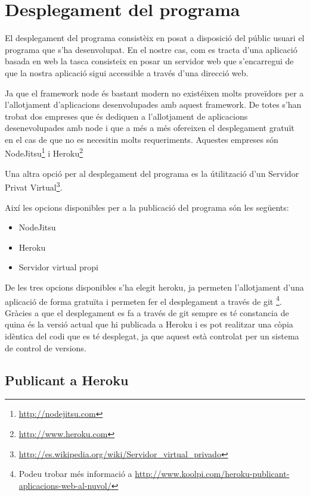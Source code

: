 \chapter{Desplegament del programa}

El desplegament del programa consistèix en posat a disposició del públic usuari el programa que s'ha desenvolupat. En el nostre cas, com es tracta d'una aplicació basada en web la tasca consisteix en posar un servidor web que s'encarregui de que la nostra aplicació sigui accessible a través d'una direcció web. 

Ja que el framework node és bastant modern no existéixen molts proveïdors per a l'allotjament d'aplicacions desenvolupades amb aquest framework. De totes s'han trobat dos empreses que és dediquen a l'allotjament de aplicacions desenevolupades amb node i que a més a més ofereixen el desplegament gratuït en el cas de que no es necesitin molts requeriments. Aquestes empreses són NodeJitsu\footnote{\url{http://nodejitsu.com}} i Heroku\footnote{\url{http://www.heroku.com}}

Una altra opció per al desplegament del programa es la útilització d'un Servidor Privat Virtual\footnote{\url{http://es.wikipedia.org/wiki/Servidor_virtual_privado}}. 

Així les opcions disponibles per a la publicació del programa són les següents: 

\begin{itemize}
\item{NodeJitsu}
\item{Heroku}
\item{Servidor virtual propi}
\end{itemize}


De les tres opcions disponibles s'ha elegit heroku, ja permeten l'allotjament d'una aplicació de forma gratuïta i permeten fer el desplegament a través de git \footnote{Podeu trobar més informació a \url{http://www.koolpi.com/heroku-publicant-aplicacions-web-al-nuvol/} }. Gràcies a que el desplegament es fa a través de git sempre es té constancia de quina és la versió actual que hi publicada a Heroku i es pot realitzar una còpia idèntica del codi que es té desplegat, ja que aquest està controlat per un sistema de control de versions.

\section{Publicant a Heroku}


